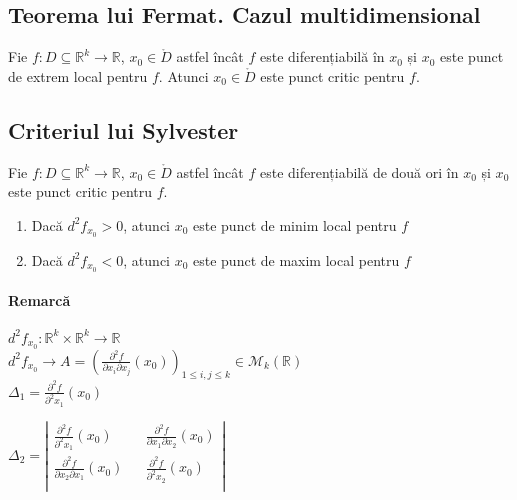 \subsection{Teorema lui Fermat. Cazul multidimensional}
Fie $f:D \subseteq \mathbb{R}^{k} \rightarrow \mathbb{R}$, $x_{0} \in \mathring{D}$ astfel încât $f$ este diferențiabilă în $x_{0}$ și
$x_{0}$ este punct de extrem local pentru $f$. Atunci $x_{0} \in \mathring{D}$ este punct critic pentru $f$.

\subsection{Criteriul lui Sylvester}
Fie $f:D \subseteq \mathbb{R}^{k} \rightarrow \mathbb{R}$, $x_{0} \in \mathring{D}$ astfel încât $f$ este diferențiabilă de două
ori în $x_{0}$ și $x_{0}$ este punct critic pentru $f$.
\begin{enumerate}[label=\emph{\alph*})]
    \item Dacă $d^{2}f_{x_{0}} > 0$, atunci $x_{0}$ este punct de minim local pentru $f$
    \item Dacă $d^{2}f_{x_{0}} < 0$, atunci $x_{0}$ este punct de maxim local pentru $f$
\end{enumerate}

\paragraph{Remarcă}
$d^{2}f_{x_{0}}:\mathbb{R}^{k} \times \mathbb{R}^{k} \rightarrow \mathbb{R}$ \\
$d^{2}f_{x_{0}} \rightarrow A = \left( \displaystyle\frac{\partial^{2} f}{\partial x_{i} \partial x_{j}}(x_{0}) \right)_{1 \leq i, j \leq k} \in \mathcal{M}_{k}(\mathbb{R})$\\

$\Delta_{1} = \displaystyle\frac{\partial^{2} f}{\partial^{2} x_{1}}(x_{0})$

$\Delta_{2} = \left|
                \begin{array}{ccc}
                    \displaystyle\frac{\partial^{2} f}{\partial^{2} x_{1}}(x_{0}) && \displaystyle\frac{\partial^{2} f}{\partial x_{1} \partial x_{2}}(x_{0})\\
                    \displaystyle\frac{\partial^{2} f}{\partial x_{2} \partial x_{1}}(x_{0}) && \displaystyle\frac{\partial^{2} f}{\partial^{2} x_{2}}(x_{0})\\
                \end{array}
              \right|$

